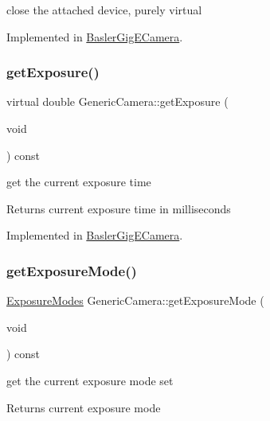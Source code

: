 close the attached device, purely virtual 

Implemented in \hyperlink{class_basler_gig_e_camera_a13a51a76116cccbd537725457d83254f}{Basler\+Gig\+E\+Camera}.

\mbox{\label{class_generic_camera_ae3fe4b50577c854037b7a77dade27487}} 
\subsubsection{\texorpdfstring{get\+Exposure()}{getExposure()}}
{\footnotesize\ttfamily virtual double Generic\+Camera\+::get\+Exposure (\begin{DoxyParamCaption}\item[{void}]{ }\end{DoxyParamCaption}) const\hspace{0.3cm}{\ttfamily [pure virtual]}}

get the current exposure time \begin{DoxyReturn}{Returns}
current exposure time in milliseconds 
\end{DoxyReturn}


Implemented in \hyperlink{class_basler_gig_e_camera_a5f7897cae5155958ecaa8b2b9196e4e6}{Basler\+Gig\+E\+Camera}.

\mbox{\label{class_generic_camera_afdd27d857471c1bca22f10520ef28a35}} 
\subsubsection{\texorpdfstring{get\+Exposure\+Mode()}{getExposureMode()}}
{\footnotesize\ttfamily \hyperlink{constants_8h_a6e920987695b1da6e2df4e41dc867e18}{Exposure\+Modes} Generic\+Camera\+::get\+Exposure\+Mode (\begin{DoxyParamCaption}\item[{void}]{ }\end{DoxyParamCaption}) const\hspace{0.3cm}{\ttfamily [inline]}}

get the current exposure mode set \begin{DoxyReturn}{Returns}
current exposure mode 
\end{DoxyReturn}
\mbox{\label{class_generic_camera_a31369d7e310827a9ac3b4366ddcbf22e}} 
